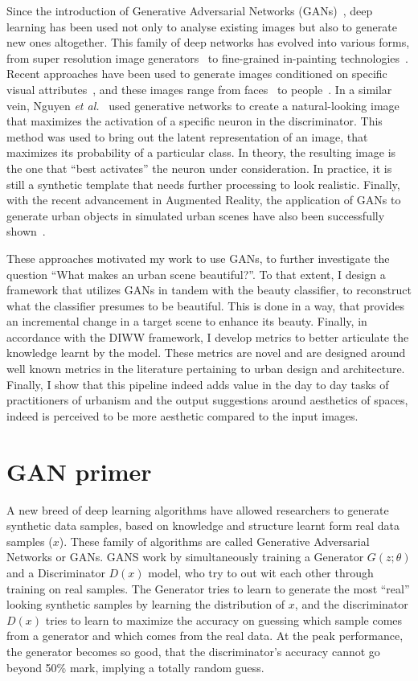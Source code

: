 Since the introduction of Generative Adversarial Networks (GANs)~\cite{goodfellow2014generative}, deep learning has been used not only to analyse existing images but also to generate new ones altogether. This family of deep networks has evolved into various forms, from super resolution image generators~\cite{ledig2017photo} to fine-grained in-painting technologies~\cite{pathak2016context}. Recent approaches have been used to generate images conditioned on specific visual attributes~\cite{yan2015attribute2image}, and these images range from faces~\cite{taigman2016unsupervised} to people~\cite{ma2018disentangled}. In a similar vein, Nguyen \emph{et al.}~\cite{nguyen2016synthesizing} used generative networks to create a natural-looking image that maximizes the activation of a specific neuron in the discriminator. This method was used to bring out the latent representation of an image, that maximizes its probability of a particular class. In theory, the resulting image is the one that ``best activates'' the neuron under consideration. In practice, it is still a synthetic template that needs further processing to look realistic.   Finally, with the recent advancement in Augmented Reality, the application of GANs to generate urban objects in simulated urban scenes have also been successfully shown~\cite{alhaija2018augmented}. 

These approaches motivated my work to use GANs, to further investigate the question ``What makes an urban scene beautiful?''. To that extent, I design a framework that utilizes GANs in tandem with the beauty classifier, to reconstruct what the classifier presumes to be beautiful. This is done in a way, that provides an incremental change in a target scene to enhance its beauty. Finally, in accordance with the DIWW framework, I develop metrics to better articulate the knowledge learnt by the model. These metrics are novel and are designed around well known metrics in the literature pertaining to urban design and architecture. 
Finally, I show that this pipeline indeed adds value in the day to day tasks of practitioners of urbanism and the output suggestions around aesthetics of spaces, indeed is perceived to be more aesthetic compared to the input images. 

\section{GAN primer}
A new breed of deep learning algorithms have allowed researchers to generate synthetic data samples, based on knowledge and structure learnt form real data samples ($x$). These family of algorithms are called Generative Adversarial Networks or GANs. GANS work by simultaneously training a Generator $G(z;\theta)$ and a Discriminator $D(x)$ model, who try to out wit each other through training on real samples. The Generator tries to learn to generate the most ``real'' looking synthetic samples by learning the distribution of $x$, and the discriminator $D(x)$ tries to learn to maximize the accuracy on guessing which sample comes from a generator and which comes from the real data. At the peak performance, the generator becomes so good, that the discriminator's accuracy cannot go beyond 50\% mark, implying a totally random guess. 


